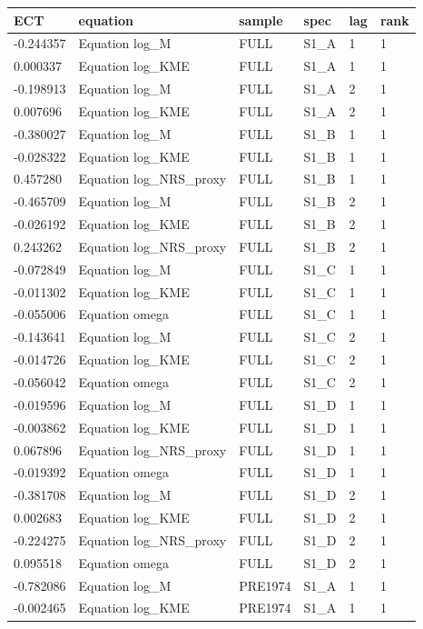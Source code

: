 \begin{tabular}{llllll}
\hline
ECT & equation & sample & spec & lag & rank \\
\hline
-0.244357 & Equation log\_M & FULL & S1\_A & 1 & 1 \\
0.000337 & Equation log\_KME & FULL & S1\_A & 1 & 1 \\
-0.198913 & Equation log\_M & FULL & S1\_A & 2 & 1 \\
0.007696 & Equation log\_KME & FULL & S1\_A & 2 & 1 \\
-0.380027 & Equation log\_M & FULL & S1\_B & 1 & 1 \\
-0.028322 & Equation log\_KME & FULL & S1\_B & 1 & 1 \\
0.457280 & Equation log\_NRS\_proxy & FULL & S1\_B & 1 & 1 \\
-0.465709 & Equation log\_M & FULL & S1\_B & 2 & 1 \\
-0.026192 & Equation log\_KME & FULL & S1\_B & 2 & 1 \\
0.243262 & Equation log\_NRS\_proxy & FULL & S1\_B & 2 & 1 \\
-0.072849 & Equation log\_M & FULL & S1\_C & 1 & 1 \\
-0.011302 & Equation log\_KME & FULL & S1\_C & 1 & 1 \\
-0.055006 & Equation omega & FULL & S1\_C & 1 & 1 \\
-0.143641 & Equation log\_M & FULL & S1\_C & 2 & 1 \\
-0.014726 & Equation log\_KME & FULL & S1\_C & 2 & 1 \\
-0.056042 & Equation omega & FULL & S1\_C & 2 & 1 \\
-0.019596 & Equation log\_M & FULL & S1\_D & 1 & 1 \\
-0.003862 & Equation log\_KME & FULL & S1\_D & 1 & 1 \\
0.067896 & Equation log\_NRS\_proxy & FULL & S1\_D & 1 & 1 \\
-0.019392 & Equation omega & FULL & S1\_D & 1 & 1 \\
-0.381708 & Equation log\_M & FULL & S1\_D & 2 & 1 \\
0.002683 & Equation log\_KME & FULL & S1\_D & 2 & 1 \\
-0.224275 & Equation log\_NRS\_proxy & FULL & S1\_D & 2 & 1 \\
0.095518 & Equation omega & FULL & S1\_D & 2 & 1 \\
-0.782086 & Equation log\_M & PRE1974 & S1\_A & 1 & 1 \\
-0.002465 & Equation log\_KME & PRE1974 & S1\_A & 1 & 1 \\

\end{tabular}
